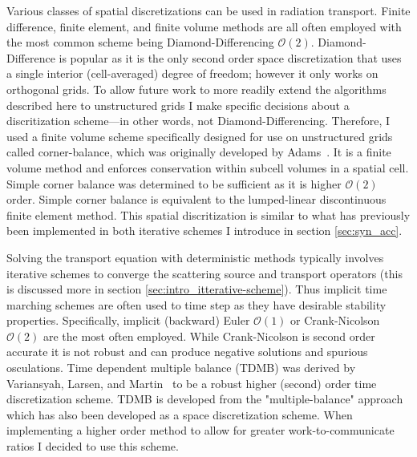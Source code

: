 Various classes of spatial discretizations can be used in radiation transport.
Finite difference, finite element, and finite volume methods are all often employed with the most common scheme being Diamond-Differencing $\mathcal{O}(2)$.
Diamond-Difference is popular as it is the only second order space discretization that uses a single interior (cell-averaged) degree of freedom; however it only works on orthogonal grids.
To allow future work to more readily extend the algorithms described here to unstructured grids I make specific decisions about a discritization scheme---in other words, not Diamond-Differencing.
Therefore, I used a finite volume scheme specifically designed for use on unstructured grids called corner-balance, which was originally developed by Adams~\cite{adams_subcell_1997}.
It is a finite volume method and enforces conservation within subcell volumes in a spatial cell.
Simple corner balance was determined to be sufficient as it is higher $\mathcal{O}(2)$ order.
Simple corner balance is equivalent to the lumped-linear discontinuous finite element method.
This spatial discritization is similar to what has previously been implemented in both iterative schemes I introduce in section \ref{sec:syn_acc}.

Solving the transport equation with deterministic methods typically involves iterative schemes to converge the scattering source and transport operators (this is discussed more in section \ref{sec:intro_itterative-scheme}).
Thus implicit time marching schemes are often used to time step as they have desirable stability properties.
Specifically, implicit (backward) Euler $\mathcal{O}(1)$ or Crank-Nicolson $\mathcal{O}(2)$ are the most often employed.
While Crank-Nicolson is second order accurate it is not robust and can produce negative solutions and spurious osculations.
Time dependent multiple balance (TDMB) was derived by Variansyah, Larsen, and Martin~\cite{variansyah_robust_2021, ilham_phd} to be a robust higher (second) order time discretization scheme.
TDMB is developed from the "multiple-balance" approach which has also been developed as a space discretization scheme.
When implementing a higher order method to allow for greater work-to-communicate ratios I decided to use this scheme. 

